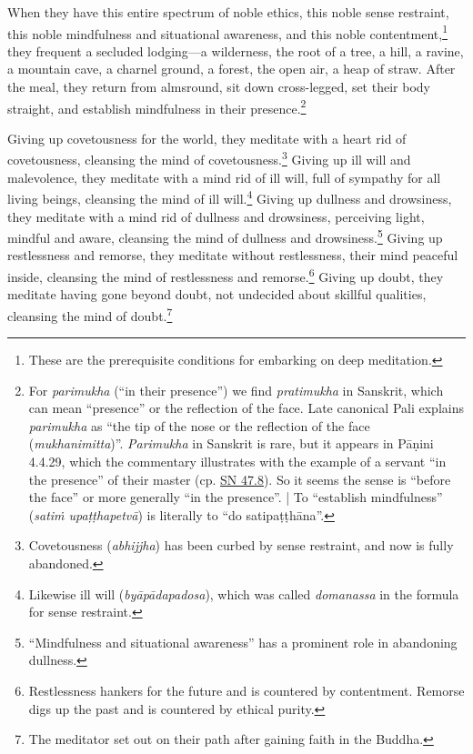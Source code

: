 \documentclass[12pt,openany]{book}%
\begin{document}
When they have this entire spectrum of noble ethics, this noble sense restraint, this noble mindfulness and situational awareness, and this noble contentment,\footnote{These are the prerequisite conditions for embarking on deep meditation. } they frequent a secluded lodging—a wilderness, the root of a tree, a hill, a ravine, a mountain cave, a charnel ground, a forest, the open air, a heap of straw. After the meal, they return from almsround, sit down cross-legged, set their body straight, and establish mindfulness in their presence.\footnote{For \textit{parimukha} (“in their presence”) we find \textit{pratimukha} in Sanskrit, which can mean “presence” or the reflection of the face. Late canonical Pali explains \textit{parimukha} as “the tip of the nose or the reflection of the face (\textit{mukhanimitta})”. \textit{Parimukha} in Sanskrit is rare, but it appears in \textsanskrit{Pāṇini} 4.4.29, which the commentary illustrates with the example of a servant “in the presence” of their master (cp. \href{https://suttacentral.net/sn47.8/en/sujato}{SN 47.8}). So it seems the sense is “before the face” or more generally “in the presence”. | To “establish mindfulness” (\textit{\textsanskrit{satiṁ} \textsanskrit{upaṭṭhapetvā}}) is literally to “do \textsanskrit{satipaṭṭhāna}”. } 

Giving up covetousness for the world, they meditate with a heart rid of covetousness, cleansing the mind of covetousness.\footnote{Covetousness (\textit{abhijjha}) has been curbed by sense restraint, and now is fully abandoned. } Giving up ill will and malevolence, they meditate with a mind rid of ill will, full of sympathy for all living beings, cleansing the mind of ill will.\footnote{Likewise ill will (\textit{\textsanskrit{byāpādapadosa}}), which was called \textit{domanassa} in the formula for sense restraint. } Giving up dullness and drowsiness, they meditate with a mind rid of dullness and drowsiness, perceiving light, mindful and aware, cleansing the mind of dullness and drowsiness.\footnote{“Mindfulness and situational awareness” has a prominent role in abandoning dullness. } Giving up restlessness and remorse, they meditate without restlessness, their mind peaceful inside, cleansing the mind of restlessness and remorse.\footnote{Restlessness hankers for the future and is countered by contentment. Remorse digs up the past and is countered by ethical purity. } Giving up doubt, they meditate having gone beyond doubt, not undecided about skillful qualities, cleansing the mind of doubt.\footnote{The meditator set out on their path after gaining faith in the Buddha. } 
\end{document}
